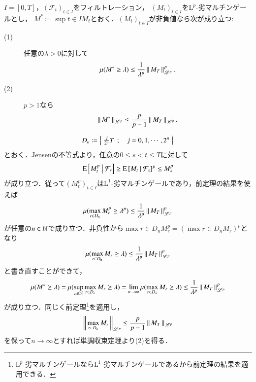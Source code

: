 	\begin{itembox}[l]{}
		\begin{thm}[Doobの不等式(2)]
			$I=[0,T]$，$(\mathcal{F}_t)_{t \in I}$をフィルトレーション，
			$(M_t)_{t \in I}$を$\mathrm{L}^p$-劣マルチンゲールとし，
			$M^* \coloneqq \sup{t \in I}{M_t}$とおく．$(M_t)_{t \in I}$が非負値なら次が成り立つ:
			\begin{description}
				\item[(1)] 任意の$\lambda > 0$に対して
					\begin{align}
						\mu(M^* \geq \lambda) \leq \frac{1}{\lambda^p} \left\|\, M_T\, \right\|_{\mathscr{L}^p}^p.
					\end{align}
				\item[(2)] $p > 1$なら
					\begin{align}
						\left\|\, M^*\, \right\|_{\mathscr{L}^p} \leq \frac{p}{p-1} \left\|\, M_T\, \right\|_{\mathscr{L}^p}.
					\end{align}
			\end{description}
		\label{thm:Doob_inequality_2}	
		\end{thm}
	\end{itembox}
	
	\begin{prf}
		\begin{align}
			D_n \coloneqq \left\{\ \tfrac{j}{2^n}T\ \, ; \quad j=0,1,\cdots,2^n\ \right\}
		\end{align}
		とおく．Jensenの不等式より，任意の$0 \leq s < t \leq T$に対して
		\begin{align}
			\operatorname{E} \left[ M_t^p \ \middle|\ \mathcal{F}_s \right] \geq \operatorname{E} \left[ M_t \ \middle|\ \mathcal{F}_s \right]^p \leq M_s^p
		\end{align}
		が成り立つ．従って$(M_t^p)_{t \in I}$は$\mathrm{L}^1$-劣マルチンゲールであり，前定理の結果を使えば
		\begin{align}
			\mu(\operatorname*{max}_{r \in D_n} M_r^p \geq \lambda^p) \leq \frac{1}{\lambda^p} \left\|\, M_T\, \right\|_{\mathscr{L}^p}^p
		\end{align}
		が任意の$n \in \mathbb{N}$で成り立つ．非負性から$\max{r \in D_n}{M_r^p} = (\max{r \in D_n}{M_r})^p$となり
		\begin{align}
			\mu(\operatorname*{max}_{r \in D_n} M_r \geq \lambda) \leq \frac{1}{\lambda^p} \left\|\, M_T\, \right\|_{\mathscr{L}^p}^p
		\end{align}
		と書き直すことができて，
		\begin{align}
			\mu(M^* \geq \lambda) 
			= \mu(\operatorname*{sup}_{n \in \mathbb{N}} \operatorname*{max}_{r \in D_n} M_r \geq \lambda)
			= \lim_{n \to \infty} \mu(\operatorname*{max}_{r \in D_n} M_r \geq \lambda) \leq \frac{1}{\lambda^p} \left\|\, M_T\, \right\|_{\mathscr{L}^p}^p
		\end{align}
		が成り立つ．同じく前定理\footnote{$\mathrm{L}^p$-劣マルチンゲールなら$\mathrm{L}^1$-劣マルチンゲールであるから前定理の結果を適用できる．}を適用し，
		\begin{align}
			\left\|\, \operatorname*{max}_{r \in D_n} M_r\, \right\|_{\mathscr{L}^p} \leq \frac{p}{p-1} \left\|\, M_T\, \right\|_{\mathscr{L}^p}
		\end{align}
		を保って$n \longrightarrow \infty$とすれば単調収束定理より(2)を得る．
		\QED
	\end{prf}
	
